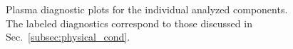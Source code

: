 \documentclass[twocolumn,linenumbers]{aastex63}
\begin{document}
\begin{figure}
  \caption{Plasma diagnostic plots for the individual analyzed components. The labeled diagnostics correspond to those discussed in Sec.~\ref{subsec:physical_cond}.}
\label{fig:plasma}
\end{figure}

























\end{document}
